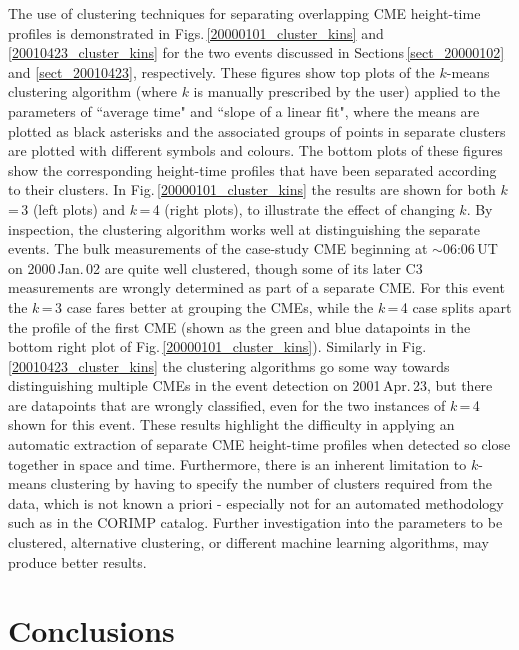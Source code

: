 \documentclass[referee,a4paper,12pt,traditabstract]{swsc}
\begin{document}
\begin{linenumbers}
The use of clustering techniques for separating overlapping CME height-time profiles is demonstrated in Figs.\,\ref{20000101_cluster_kins} and \ref{20010423_cluster_kins} for the two events discussed in Sections\,\ref{sect_20000102} and \ref{sect_20010423}, respectively. These figures show top plots of the $k$-means clustering algorithm (where $k$ is manually prescribed by the user) applied to the parameters of ``average time" and ``slope of a linear fit", where the means are plotted as black asterisks and the associated groups of points in separate clusters are plotted with different symbols and colours. The bottom plots of these figures show the corresponding height-time profiles that have been separated according to their clusters. In Fig.\,\ref{20000101_cluster_kins} the results are shown for both $k$\,=\,3 (left plots) and $k$\,=\,4 (right plots), to illustrate the effect of changing $k$. By inspection, the clustering algorithm works well at distinguishing the separate events. The bulk measurements of the case-study CME beginning at $\sim$06:06\,UT on 2000\,Jan.\,02 are quite well clustered, though some of its later C3 measurements are wrongly determined as part of a separate CME. For this event the $k$\,=\,3 case fares better at grouping the CMEs, while the $k$\,=\,4 case splits apart the profile of the first CME (shown as the green and blue datapoints in the bottom right plot of Fig.\,\ref{20000101_cluster_kins}). Similarly in Fig.\,\ref{20010423_cluster_kins} the clustering algorithms go some way towards distinguishing multiple CMEs in the event detection on 2001\,Apr.\,23, but there are datapoints that are wrongly classified, even for the two instances of $k$\,=\,4 shown for this event. These results highlight the difficulty in applying an automatic extraction of separate CME height-time profiles when detected so close together in space and time. Furthermore, there is an inherent limitation to $k$-means clustering by having to specify the number of clusters required from the data, which is not known a priori - especially not for an automated methodology such as in the CORIMP catalog. Further investigation into the parameters to be clustered, alternative clustering, or different machine learning algorithms, may produce better results.


\section{Conclusions}
\label{sect_conclusions}


\end{linenumbers}
\end{document}
